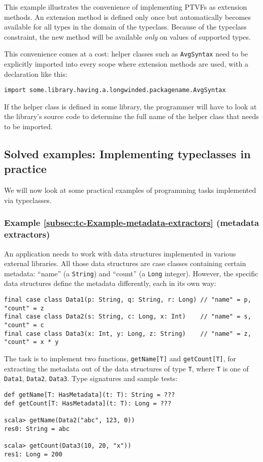 This example illustrates the convenience of implementing PTVFs as
extension methods. An extension method is defined only once but automatically
becomes available for all types in the domain of the typeclass. Because
of the typeclass constraint, the new method will be available \emph{only}
on values of supported types.

This convenience comes at a cost: helper classes such as \lstinline!AvgSyntax!
need to be explicitly imported into every scope where extension methods
are used, with a declaration like this:
\begin{lstlisting}
import some.library.having.a.longwinded.packagename.AvgSyntax
\end{lstlisting}
If the helper class is defined in some library, the programmer will
have to look at the library's source code to determine the full name
of the helper class that needs to be imported.

\subsection{Solved examples: Implementing typeclasses in practice}

We will now look at some practical examples of programming tasks implemented
via typeclasses.

\subsubsection{Example \label{subsec:tc-Example-metadata-extractors}\ref{subsec:tc-Example-metadata-extractors}
(metadata extractors)}

An application needs to work with data structures implemented in various
external libraries. All those data structures are case classes containing
certain metadata: ``name'' (a \lstinline!String!) and ``count''
(a \lstinline!Long! integer). However, the specific data structures
define the metadata differently, each in its own way:
\begin{lstlisting}
final case class Data1(p: String, q: String, r: Long) // "name" = p, "count" = z
final case class Data2(s: String, c: Long, x: Int)    // "name" = s, "count" = c
final case class Data3(x: Int, y: Long, z: String)    // "name" = z, "count" = x * y
\end{lstlisting}
The task is to implement two functions, \lstinline!getName[T]! and
\lstinline!getCount[T]!, for extracting the metadata out of the data
structures of type \lstinline!T!, where \lstinline!T! is one of
\lstinline!Data1!, \lstinline!Data2!, \lstinline!Data3!. Type signatures
and sample tests:
\begin{lstlisting}
def getName[T: HasMetadata](t: T): String = ???
def getCount[T: HasMetadata](t: T): Long = ???

scala> getName(Data2("abc", 123, 0))
res0: String = abc

scala> getCount(Data3(10, 20, "x"))
res1: Long = 200
\end{lstlisting}


